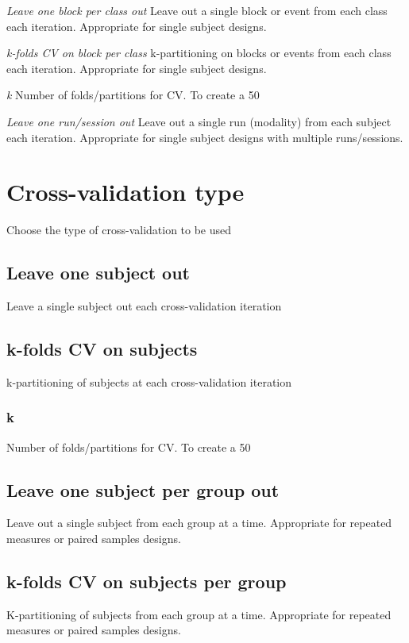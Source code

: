 \textit{Leave one block per class out}
Leave out a single block or event from each class each iteration. Appropriate for single subject designs.


\textit{k-folds CV on block per class}
k-partitioning on blocks or events from each class each iteration. Appropriate for single subject designs.


\textit{k}
Number of folds/partitions for CV. To create a 50%


\textit{Leave one run/session out}
Leave out a single run (modality) from each subject each iteration. Appropriate for single subject designs with multiple runs/sessions.


\section{Cross-validation type}
Choose the type of cross-validation to be used


\subsection{Leave one subject out}
Leave a single subject out each cross-validation iteration


\subsection{k-folds CV on subjects}
k-partitioning of subjects at each cross-validation iteration


\subsubsection{k}
Number of folds/partitions for CV. To create a 50%


\subsection{Leave one subject per group out}
Leave out a single subject from each group at a time. Appropriate for repeated measures or paired samples designs.


\subsection{k-folds CV on subjects per group}
K-partitioning of subjects from each group at a time. Appropriate for repeated measures or paired samples designs.


